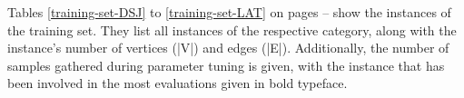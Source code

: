 \documentclass[thesis.tex]{subfiles}
\begin{document}
Tables \ref{training-set-DSJ} to \ref{training-set-LAT} on pages \pageref{training-set-DSJ}--\pageref{training-set-LAT} show the instances of the training set. They list all instances of the respective category, along with the instance's number of vertices (|V|) and edges (|E|). Additionally, the number of samples gathered during parameter tuning is given, with the instance that has been involved in the most evaluations given in bold typeface.

\newcommand{\InstanceDescription}[5]{%
   \begin{table}[htbp]\caption[Training Set, #1 Instances]{#4}\label{training-set-#1}\centering\small{#5}\end{table}}
\end{document}
